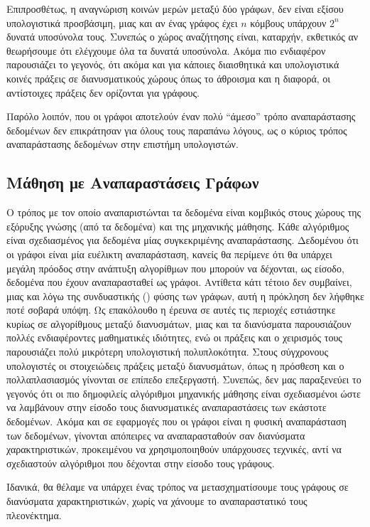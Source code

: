 Επιπροσθέτως, η αναγνώριση κοινών μερών μεταξύ δύο γράφων, δεν είναι εξίσου υπολογιστικά προσβάσιμη, μιας και αν ένας γράφος έχει $n$ κόμβους υπάρχουν $2^{n}$ δυνατά υποσύνολα τους.
Συνεπώς ο χώρος αναζήτησης είναι, καταρχήν, εκθετικός αν θεωρήσουμε ότι ελέγχουμε όλα τα δυνατά υποσύνολα.
Ακόμα πιο ενδιαφέρον παρουσιάζει το γεγονός, ότι ακόμα και για κάποιες διαισθητικά και υπολογιστικά κοινές πράξεις σε διανυσματικούς χώρους όπως το άθροισμα και η διαφορά, οι αντίστοιχες πράξεις δεν ορίζονται για γράφους.\par
Παρόλο λοιπόν, που οι γράφοι αποτελούν έναν πολύ ``άμεσο'' τρόπο αναπαράστασης δεδομένων δεν επικράτησαν για όλους τους παραπάνω λόγους, ως ο κύριος τρόπος αναπαράστασης δεδομένων στην επιστήμη υπολογιστών.
\subsection{Μάθηση με Αναπαραστάσεις Γράφων}
Ο τρόπος με τον οποίο αναπαριστώνται τα δεδομένα είναι κομβικός στους χώρους της εξόρυξης γνώσης (από τα δεδομένα) και της μηχανικής μάθησης.
Κάθε αλγόριθμος είναι σχεδιασμένος για δεδομένα μίας συγκεκριμένης αναπαράστασης.
Δεδομένου ότι οι γράφοι είναι μία ευέλικτη αναπαράσταση, κανείς θα περίμενε ότι θα υπάρχει μεγάλη πρόοδος στην ανάπτυξη αλγορίθμων που μπορούν να δέχονται, ως είσοδο, δεδομένα που έχουν αναπαρασταθεί ως γράφοι.
Αντίθετα κάτι τέτοιο δεν συμβαίνει, μιας και λόγω της συνδυαστικής () φύσης των γράφων, αυτή η πρόκληση δεν λήφθηκε ποτέ σοβαρά υπόψη.
Ως επακόλουθο η έρευνα σε αυτές τις περιοχές εστιάστηκε κυρίως σε αλγορίθμους μεταξύ διανυσμάτων, μιας και τα διανύσματα παρουσιάζουν πολλές ενδιαφέροντες μαθηματικές ιδιότητες, ενώ οι πράξεις και ο χειρισμός τους παρουσιάζει πολύ μικρότερη υπολογιστική πολυπλοκότητα.
Στους σύγχρονους υπολογιστές οι στοιχειώδεις πράξεις μεταξύ διανυσμάτων, όπως η πρόσθεση και ο πολλαπλασιασμός γίνονται σε επίπεδο επεξεργαστή.
Συνεπώς, δεν μας παραξενεύει το γεγονός ότι οι πιο δημοφιλείς αλγόριθμοι μηχανικής μάθησης είναι σχεδιασμένοι ώστε να λαμβάνουν στην είσοδο τους διανυσματικές αναπαραστάσεις των εκάστοτε δεδομένων. 
Ακόμα και σε εφαρμογές που οι γράφοι είναι η φυσική αναπαράσταση των δεδομένων, γίνονται απόπειρες να αναπαρασταθούν σαν διανύσματα χαρακτηριστικών, προκειμένου να χρησιμοποιηθούν υπάρχουσες τεχνικές, αντί να σχεδιαστούν αλγόριθμοι που δέχονται στην είσοδο τους γράφους.\par
Ιδανικά, θα θέλαμε να υπάρχει ένας τρόπος να μετασχηματίσουμε τους γράφους σε διανύσματα χαρακτηριστικών, χωρίς να χάνουμε το αναπαραστατικό τους πλεονέκτημα.
